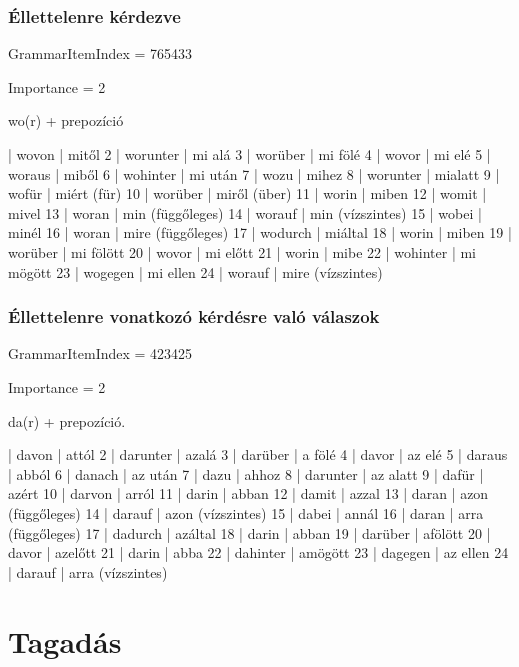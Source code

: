 \documentclass{article}
\newenvironment{desc}{\verbatim}{\endverbatim}
\newenvironment{exmp}{\verbatim}{\endverbatim}
\begin{document}
\subsubsection{Éllettelenre kérdezve}

GrammarItemIndex = 765433

Importance = 2

\begin{desc}
wo(r) + prepozíció
\end{desc}

\begin{exmp}
1 | wovon | mitől
2 | worunter | mi alá
3 | worüber | mi fölé
4 | wovor | mi elé
5 | woraus | miből
6 | wohinter | mi után
7 | wozu | mihez
8 | worunter | mialatt
9 | wofür | miért (für)
10 | worüber | miről (über)
11 | worin | miben
12 | womit | mivel
13 | woran | min (függőleges)
14 | worauf | min (vízszintes)
15 | wobei | minél
16 | woran | mire (függőleges)
17 | wodurch | miáltal
18 | worin | miben
19 | worüber | mi fölött
20 | wovor | mi előtt
21 | worin | mibe
22 | wohinter | mi mögött
23 | wogegen | mi ellen
24 | worauf | mire (vízszintes)
\end{exmp}

\subsubsection{Éllettelenre vonatkozó kérdésre való válaszok}

GrammarItemIndex = 423425

Importance = 2

\begin{desc}
da(r) + prepozíció.
\end{desc}

\begin{exmp}
1 | davon | attól
2 | darunter | azalá
3 | darüber | a fölé
4 | davor | az elé
5 | daraus | abból
6 | danach | az után
7 | dazu | ahhoz
8 | darunter | az alatt
9 | dafür | azért
10 | darvon | arról
11 | darin | abban
12 | damit | azzal
13 | daran | azon (függőleges)
14 | darauf | azon (vízszintes)
15 | dabei | annál
16 | daran | arra (függőleges)
17 | dadurch | azáltal
18 | darin | abban
19 | darüber | afölött
20 | davor | azelőtt
21 | darin | abba
22 | dahinter | amögött
23 | dagegen | az ellen
24 | darauf | arra (vízszintes)
\end{exmp}

\section{Tagadás}
\end{document}
